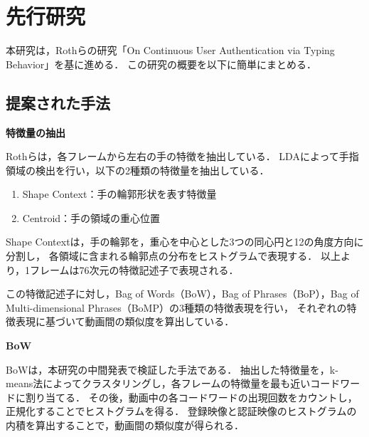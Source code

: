 \documentclass[twoside,twocolumn]{ujarticle}
\begin{document}

%
%
\section{先行研究}
%
本研究は，Rothらの研究「On Continuous User Authentication via Typing Behavior」を基に進める．
この研究の概要を以下に簡単にまとめる．

\subsection{提案された手法}

\noindent \textbf{特徴量の抽出}

Rothらは，各フレームから左右の手の特徴を抽出している．
LDAによって手指領域の検出を行い，以下の2種類の特徴量を抽出している．
\begin{enumerate}
  \setlength{\parskip}{0cm}
  \setlength{\itemsep}{0cm}
  \item Shape Context：手の輪郭形状を表す特徴量
  \item Centroid：手の領域の重心位置
\end{enumerate}
Shape Contextは，手の輪郭を，重心を中心とした3つの同心円と12の角度方向に分割し，
各領域に含まれる輪郭点の分布をヒストグラムで表現する．
以上より，1フレームは76次元の特徴記述子で表現される．

この特徴記述子に対し，Bag of Words（BoW），Bag of Phrases（BoP），Bag of Multi-dimensional Phrases（BoMP）の3種類の特徴表現を行い，
それぞれの特徴表現に基づいて動画間の類似度を算出している．

\vspace{0.2cm}
\noindent \textbf{BoW}

BoWは，本研究の中間発表で検証した手法である．
抽出した特徴量を，k-means法によってクラスタリングし，各フレームの特徴量を最も近いコードワードに割り当てる．
その後，動画中の各コードワードの出現回数をカウントし，正規化することでヒストグラムを得る．
登録映像と認証映像のヒストグラムの内積を算出することで，動画間の類似度が得られる．
\end{document}
